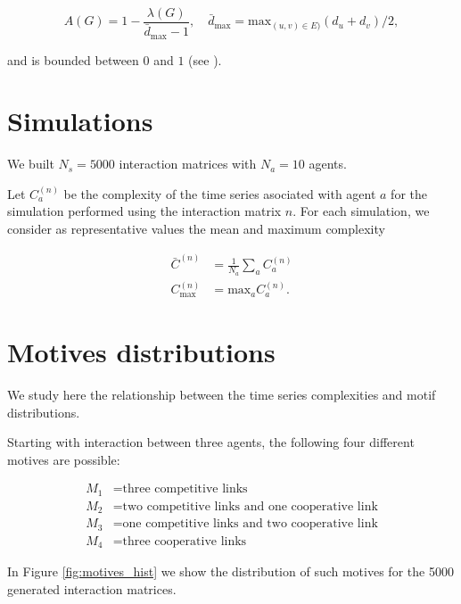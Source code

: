 \documentclass[10pt]{article}
\begin{document}
\begin{equation}
A(G) = 1 - \dfrac{\lambda(G)}{\bar{d}_{\mathrm{max}} - 1},\quad \bar{d}_{\mathrm{max}} = \mathrm{max}_{(u,v)\in E)} (d_u + d_v) / 2,
\end{equation}

and is bounded between $0$ and $1$ (see \cite{Belardo2014}).

\section{Simulations}

We built $N_s = 5000$ interaction matrices with $N_a = 10$ agents.
 
Let $C_a^{(n)}$ be the complexity of the time series asociated with agent $a$ for the simulation performed using the interaction matrix $n$. For each simulation, we consider as representative values the mean and maximum complexity

\begin{align}
  \bar{C}^{(n)} &= \frac{1}{N_a} \sum_a C_a^{(n)} \\
  C_{\mathrm{max}}^{(n)} &= \mathrm{max}_a C_a^{(n)}.
\end{align}

\section{Motives distributions}

We study here the relationship between the time series complexities and motif distributions. 

Starting with interaction between three agents, the following four different motives are possible:

\begin{align*}
M_1 &= \text{three competitive links} \\
M_2 &= \text{two competitive links and one cooperative link} \\
M_3 &= \text{one competitive links and two cooperative link} \\ 
M_4 &= \text{three cooperative links} 
\end{align*}

In Figure \ref{fig:motives_hist} we show the distribution of such motives for the 5000 generated interaction matrices.
\end{document}
